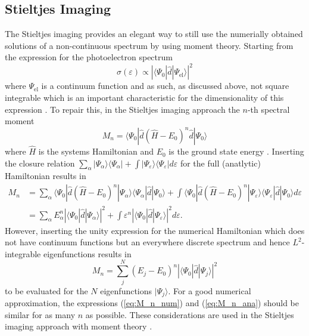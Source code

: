 \subsection{Stieltjes Imaging}
\label{ch:stieltjes}
The Stieltjes imaging provides an elegant way to still use the numerially obtained solutions of a non-continuous spectrum by using moment theory.
Starting from the expression for the photoelectron spectrum 
\begin{equation}
\sigma(\varepsilon)\propto \left|\langle \Psi_0 |\hat{d}|\Psi_\text{el} \rangle \right|^2
\end{equation}
where $\Psi_\text{el}$ is a continuum function and as such, as discussed above, not square integrable which is an important characteristic for the dimensionality of this expression \cite{stieltjesCeder}.
To repair this, in the Stieltjes imaging approach the $n$-th spectral moment
\begin{equation}
   M_n=\langle \Psi_0 |\hat{d} (\hat{H}-E_0)^n \hat{d} | \Psi_0  \rangle
\end{equation}
where $\hat{H}$ is the systems Hamiltonian and $E_0$ is the ground state energy \cite{langhoff3}.
Inserting the closure relation $\sum_\alpha |\Psi_\alpha\rangle\langle \Psi_\alpha|+\int |\Psi_\varepsilon\rangle\langle \Psi_\varepsilon| d\varepsilon$ for the full (anatlytic) Hamiltonian results in
\begin{align}\label{eq:M_n_ana}
   M_n&=\sum_\alpha \langle \Psi_0 |\hat{d} (\hat{H}-E_0)^n|\Psi_\alpha\rangle\langle \Psi_\alpha| \hat{d} | \Psi_0  \rangle
      + \int  \langle \Psi_0|\hat{d} (\hat{H}-E_0)^n|\Psi_\varepsilon\rangle\langle \Psi_\varepsilon| \hat{d} | \Psi_0  \rangle d\varepsilon \\
      &= \sum_\alpha E_\alpha^n \left|\langle \Psi_0 | \hat{d}| \Psi_\alpha\rangle \right|^2 + 
         \int \varepsilon^n \left|\langle \Psi_0 | \hat{d}| \Psi_\varepsilon\rangle \right|^2 d \varepsilon.
\end{align}
However, inserting the unity expression for the numerical Hamiltonian which does not have continuum functions but an everywhere discrete spectrum and hence $L^2$-integrable eigenfunctions results in
\begin{equation} \label{eq:M_n_num}
      M_n= \sum_j^N (E_j-E_0)^n \left| \langle \Psi_0 | \hat{d}| \Psi_j\rangle \right|^2
\end{equation}
to be evaluated \cite{stieltjesCeder} for the $N$ eigenfunctions $|\Psi_j\rangle$.
For a good numerical approximation, the expressions (\ref{eq:M_n_num}) and (\ref{eq:M_n_ana}) should be similar for as many $n$ as possible.
These considerations are used in the Stieltjes imaging approach with moment theory \cite{langhoff, langhoff2}.

